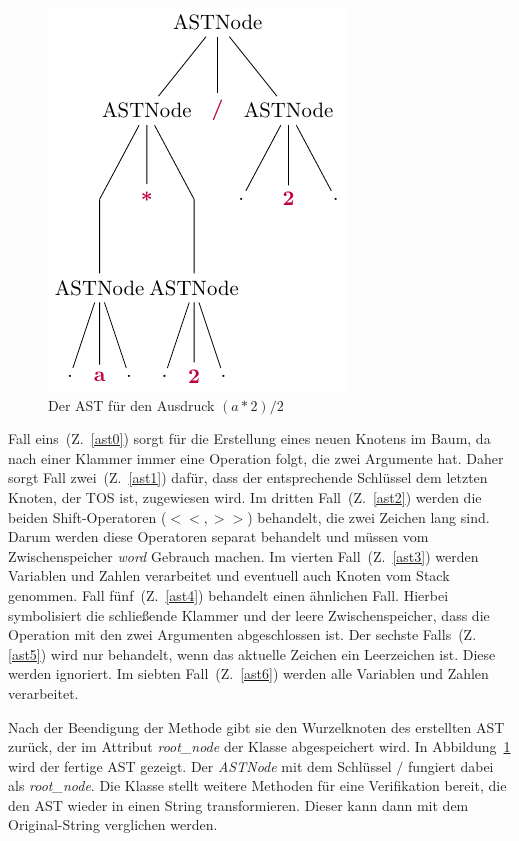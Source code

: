 \begin{figure}
    \vspace{-10mm}
    \begin{center}
      \includegraphics[scale=1.2]{../fig/ast.pdf}
    \end{center}
    \caption{Der AST für den Ausdruck $(a * 2) / 2$}
    \label{fig:astexp}
\end{figure}

Fall eins~(Z.~\ref{ast0}) sorgt für die Erstellung eines neuen Knotens im Baum, da nach einer Klammer immer eine Operation folgt, die zwei Argumente hat.
Daher sorgt Fall zwei~(Z.~\ref{ast1}) dafür, dass der entsprechende Schlüssel dem letzten Knoten, der TOS ist, zugewiesen wird. 
Im dritten Fall~(Z.~\ref{ast2}) werden die beiden Shift-Operatoren ($<<, >>$) behandelt, die zwei Zeichen lang sind. Darum werden diese Operatoren separat behandelt und müssen
vom Zwischenspeicher \textit{word} Gebrauch machen.
Im vierten Fall~(Z.~\ref{ast3}) werden Variablen und Zahlen verarbeitet und eventuell auch Knoten vom Stack genommen.
Fall fünf~(Z.~\ref{ast4}) behandelt einen ähnlichen Fall. Hierbei symbolisiert die schließende Klammer und der leere Zwischenspeicher, dass die Operation mit den zwei Argumenten abgeschlossen ist. 
Der sechste Falls~(Z. \ref{ast5}) wird nur behandelt, wenn das aktuelle Zeichen ein Leerzeichen ist. Diese werden ignoriert.
Im siebten Fall~(Z.~\ref{ast6}) werden alle Variablen und Zahlen verarbeitet.

Nach der Beendigung der Methode gibt sie den Wurzelknoten des erstellten AST zurück, der im Attribut \textit{root\_node} der Klasse abgespeichert wird.
In Abbildung~\ref{fig:astexp} wird der fertige AST gezeigt.
Der \textit{ASTNode} mit dem Schlüssel $/$ fungiert dabei als \textit{root\_node}.
Die Klasse stellt weitere Methoden für eine Verifikation bereit, die den AST wieder in einen String transformieren. Dieser kann dann mit dem Original-String verglichen werden.


